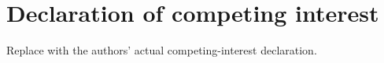 \section*{Declaration of competing interest}
Replace with the authors' actual competing-interest declaration.
